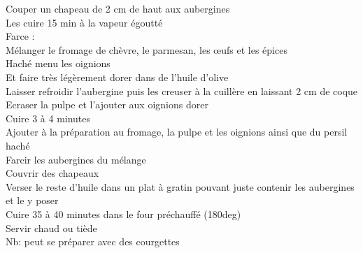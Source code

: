 \begin{minipage}[c]{\textwidth}
Couper un chapeau de 2 cm de haut aux aubergines\\
Les cuire 15 min à la vapeur égoutté\\
Farce :\\
    Mélanger le fromage de chèvre, le parmesan, les œufs et les épices\\
    Haché menu les oignions\\
    Et faire très légèrement dorer dans de l'huile d'olive\\
Laisser refroidir l’aubergine puis les creuser à la cuillère en laissant 2 cm de coque\\
Ecraser la pulpe et l'ajouter aux oignions dorer\\
Cuire 3 à 4 minutes\\
Ajouter à la préparation au fromage, la pulpe et les oignions ainsi que du persil haché\\
Farcir les aubergines du mélange\\
Couvrir des chapeaux\\
Verser le reste d'huile dans un plat à gratin pouvant juste contenir les aubergines et le y poser\\
Cuire 35 à 40 minutes dans le four préchauffé (180deg)\\
Servir chaud ou tiède\\
Nb: peut se préparer avec des courgettes\\
\\

\end{minipage}

